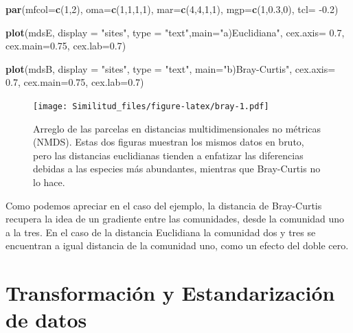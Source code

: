 \documentclass[]{book}
\newenvironment{Shaded}{\begin{snugshade}}{\end{snugshade}}
\newcommand{\KeywordTok}[1]{\textcolor[rgb]{0.13,0.29,0.53}{\textbf{{#1}}}}
\newcommand{\DataTypeTok}[1]{\textcolor[rgb]{0.13,0.29,0.53}{{#1}}}
\newcommand{\DecValTok}[1]{\textcolor[rgb]{0.00,0.00,0.81}{{#1}}}
\newcommand{\FloatTok}[1]{\textcolor[rgb]{0.00,0.00,0.81}{{#1}}}
\newcommand{\StringTok}[1]{\textcolor[rgb]{0.31,0.60,0.02}{{#1}}}
\newcommand{\NormalTok}[1]{{#1}}
\begin{document}
\begin{Shaded}
\begin{Highlighting}[]
\KeywordTok{par}\NormalTok{(}\DataTypeTok{mfcol=}\KeywordTok{c}\NormalTok{(}\DecValTok{1}\NormalTok{,}\DecValTok{2}\NormalTok{), }\DataTypeTok{oma=}\KeywordTok{c}\NormalTok{(}\DecValTok{1}\NormalTok{,}\DecValTok{1}\NormalTok{,}\DecValTok{1}\NormalTok{,}\DecValTok{1}\NormalTok{), }\DataTypeTok{mar=}\KeywordTok{c}\NormalTok{(}\DecValTok{4}\NormalTok{,}\DecValTok{4}\NormalTok{,}\DecValTok{1}\NormalTok{,}\DecValTok{1}\NormalTok{),}
    \DataTypeTok{mgp=}\KeywordTok{c}\NormalTok{(}\DecValTok{1}\NormalTok{,}\FloatTok{0.3}\NormalTok{,}\DecValTok{0}\NormalTok{), }\DataTypeTok{tcl=} \NormalTok{-}\FloatTok{0.2}\NormalTok{)}

\KeywordTok{plot}\NormalTok{(mdsE, }\DataTypeTok{display =} \StringTok{"sites"}\NormalTok{, }
     \DataTypeTok{type =} \StringTok{"text"}\NormalTok{,}\DataTypeTok{main=}\StringTok{"a)Euclidiana"}\NormalTok{, }
     \DataTypeTok{cex.axis=} \FloatTok{0.7}\NormalTok{, }\DataTypeTok{cex.main=}\FloatTok{0.75}\NormalTok{, }\DataTypeTok{cex.lab=}\FloatTok{0.7}\NormalTok{)}

\KeywordTok{plot}\NormalTok{(mdsB, }\DataTypeTok{display =} \StringTok{"sites"}\NormalTok{, }\DataTypeTok{type =} \StringTok{"text"}\NormalTok{, }
     \DataTypeTok{main=}\StringTok{"b)Bray-Curtis"}\NormalTok{, }
     \DataTypeTok{cex.axis=} \FloatTok{0.7}\NormalTok{, }\DataTypeTok{cex.main=}\FloatTok{0.75}\NormalTok{, }\DataTypeTok{cex.lab=}\FloatTok{0.7}\NormalTok{)}
\end{Highlighting}
\end{Shaded}

\begin{figure}[htbp]
\centering
\texttt{[image: Similitud\_files/figure-latex/bray-1.pdf]}
\caption{\label{fig:bray}Arreglo de las parcelas en distancias
multidimensionales no métricas (NMDS). Estas dos figuras muestran los
mismos datos en bruto, pero las distancias euclidianas tienden a
enfatizar las diferencias debidas a las especies más abundantes,
mientras que Bray-Curtis no lo hace.}
\end{figure}

Como podemos apreciar en el caso del ejemplo, la distancia de
Bray-Curtis recupera la idea de un gradiente entre las comunidades,
desde la comunidad uno a la tres. En el caso de la distancia Euclidiana
la comunidad dos y tres se encuentran a igual distancia de la comunidad
uno, como un efecto del doble cero.

\chapter{Transformación y Estandarización de
datos}\label{transformacion-y-estandarizacion-de-datos}
\end{document}
